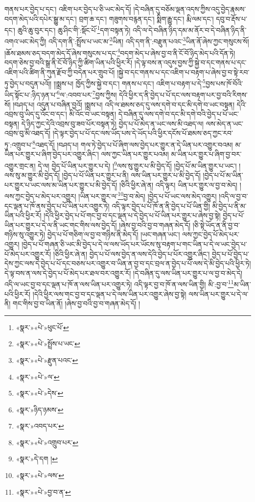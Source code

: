 གནས་པར་བྱེད་པ་དང་། འཇིག་པར་བྱེད་པ་ཅི་ཡང་མེད་དོ། །དེ་བཞིན་དུ་བཅོམ་ལྡན་འདས་ཀྱིས་འདུ་བྱེད་རྣམས་བདག་མེད་པའི་དཔེར་སྒྱུ་མ་དང་། བྲག་ཆ་དང་། གཟུགས་བརྙན་དང་། སྨིག་རྒྱུ་དང་། རྨི་ལམ་དང་། དབུ་བ་རྡོས་པ་དང་། ཆུའི་ཆུ་བུར་དང་། ཆུ་ཤིང་གི་:སྡོང་པོ་\footnote{«སྣར་»«པེ་»ཕུང་པོ་}དག་བསྟན་ཏེ། འདི་ལ་དེ་བཞིན་ཉིད་དམ་མ་ནོར་བ་དེ་བཞིན་ཉིད་ནི་འགའ་ཡང་མེད་ཀྱི། འདི་དག་ནི་:སྤྲོས་པ་ཡང་མ་\footnote{«སྣར་»«པེ་»སྤྲོས་པ་ཡང་}ཡིན། འདི་དག་ནི་:བརྫུན་པའང་\footnote{«སྣར་»«པེ་»རྫུན་པའང་}ཡིན་ནོ་ཞེས་ཀྱང་གསུངས་སོ། །ཆོས་ཐམས་ཅད་བདག་མེད་དོ་ཞེས་གསུངས་པ་དང་\footnote{«སྣར་»«པེ་»ལ་}བདག་མེད་པ་ཞེས་བྱ་བ་ནི་ངོ་བོ་ཉིད་མེད་པའི་དོན་ཏེ། བདག་ཅེས་བྱ་བའི་སྒྲ་ནི་ངོ་བོ་ཉིད་ཀྱི་ཚིག་ཡིན་པའི་ཕྱིར་རོ། །དེ་ལྟ་བས་ན་འདུས་བྱས་ཀྱི་སྐྱེ་བ་དང་གནས་པ་དང་འཇིག་པའི་ཚིག་ནི་ཀུན་རྫོབ་ཀྱི་བདེན་པར་གྲུབ་པོ། །སྐྱེ་བ་དང་གནས་པ་དང་འཇིག་པ་བརྟག་པ་ཞེས་བྱ་བ་སྟེ་རབ་ཏུ་བྱེད་པ་བདུན་པའོ།། །།སྨྲས་པ། ཁྱོད་ཀྱིས་སྐྱེ་བ་དང་། གནས་པ་དང་། འཇིག་པ་བརྟག་པ་དེ་\footnote{«སྣར་»«པེ་»དེས་}བྱས་པས་ཁོ་བོའི་ཡིད་སྟོང་པ་:ཉིད་ཉན་པ་\footnote{«སྣར་»ཉིད་ཉམས་}ལ་:འབབ་པར་\footnote{«སྣར་»འབད་པར་}བྱས་ཀྱིས། དེའི་ཕྱིར་ད་ནི་བྱེད་པ་པོ་དང་ལས་བརྟག་པར་བྱ་བའི་རིགས་སོ། །བཤད་པ། འདུན་པ་བཞིན་བྱའོ། །སྨྲས་པ། འདི་ལ་ཐམས་ཅད་དུ་ལས་དགེ་བ་དང་མི་དགེ་བ་ཡང་བསྟན། དེའི་འབྲས་བུ་ཡིད་དུ་འོང་བ་དང་། མི་འོང་བ་ཡང་བསྟན། དེ་བཞིན་དུ་ལས་དགེ་བ་དང་མི་དགེ་བའི་བྱེད་པ་པོ་ཡང་བསྟན། དེ་ཉིད་ཀྱང་དེའི་འབྲས་བུ་ཟབ་པོར་བསྟན་ཏེ། བྱེད་པ་པོ་མེད་ན་ཡང་ལས་མི་འཐད་ལ། ལས་མེད་ན་ཡང་འབྲས་བུ་མི་འཐད་དོ། །དེ་ལྟར་བྱེད་པ་པོ་དང་ལས་ཡོད་པས་དེ་ཡོད་པའི་ཕྱིར་དངོས་པོ་ཐམས་ཅད་ཀྱང་རབ་ཏུ་:འགྲུབ་པ་\footnote{«སྣར་»«པེ་»འགྲུབ་པར་}འཐད་དོ། །བཤད་པ། གལ་ཏེ་བྱེད་པ་པོ་ཞིག་ལས་བྱེད་པར་གྱུར་ན་དེ་ཡིན་པར་འགྱུར་བའམ། མ་ཡིན་པར་གྱུར་པ་ཞིག་བྱེད་པར་འགྱུར་ཞིང་། ལས་ཀྱང་ཡིན་པར་གྱུར་པའམ། མ་ཡིན་པར་གྱུར་པ་ཞིག་བྱ་བར་འགྱུར་གྲང་ན། དེ་ལ། བྱེད་པོ་ཡིན་པར་གྱུར་པ་དེ། །\footnote{«སྣར་»དེ་དག །}ལས་སུ་གྱུར་པ་མི་བྱེད་དོ། །བྱེད་པོ་མ་ཡིན་གྱུར་པ་ཡང་། །ལས་སུ་མ་གྱུར་མི་བྱེད་དོ། །བྱེད་པ་པོ་ཡིན་པར་གྱུར་པ་ནི། ལས་ཡིན་པར་གྱུར་པ་མི་བྱེད་དོ། །བྱེད་པ་པོ་མ་ཡིན་པར་གྱུར་པ་ཡང་ལས་མ་ཡིན་པར་གྱུར་པ་མི་བྱེད་དོ། །ཅིའི་ཕྱིར་ཞེ་ན། འདི་ལྟར། ཡིན་པར་གྱུར་ལ་བྱ་བ་མེད། །ལས་ཀྱང་བྱེད་པ་མེད་པར་འགྱུར། །ཡིན་པར་གྱུར་ལ་\footnote{«སྣར་»«པེ་»ལས་}བྱ་བ་མེད། །བྱེད་པ་པོ་ཡང་ལས་མེད་འགྱུར། །འདི་ལ་བྱ་བ་དང་ལྡན་པ་ཁོ་ནས་བྱེད་པ་པོ་ཡིན་པར་འགྱུར་ཏེ། འདི་ལྟར་བྱེད་པ་པོ་ཁོ་ན་ནི་བྱེད་པ་པོ་ཡིན་གྱི། མི་བྱེད་པ་ནི་མ་ཡིན་པའི་ཕྱིར་རོ། །དེའི་ཕྱིར་བྱེད་པ་པོ་གང་བྱ་བ་དང་ལྡན་པ་དེ་བྱེད་པ་པོ་ཡིན་པར་གྱུར་པ་ཞེས་བྱ་སྟེ། བྱེད་པ་པོ་ཡིན་པར་གྱུར་པ་དེ་ལ་ནི་ཡང་གང་གིས་ལས་བྱེད་དོ། །ཞེས་བྱ་བའི་བྱ་བ་གཞན་མེད་དོ། །ཅི་སྟེ་ཡོད་ན་ནི་བྱ་བ་གཉིས་སུ་འགྱུར་ཏེ། བྱེད་པ་པོ་གཅིག་ལ་བྱ་བ་གཉིས་ནི་མེད་དོ། །ཡང་གཞན་ཡང་། ལས་ཀྱང་བྱེད་པོ་མེད་པར་འགྱུར། །བྱེད་པ་པོ་གཞན་ཅི་ཡང་མི་བྱེད་པ་དེ་ལ་ལས་ཡོད་པར་ཡོངས་སུ་བརྟག་པ་གང་ཡིན་པ་དེ་ལ་ཡང་བྱེད་པ་པོ་མེད་པར་འགྱུར་རོ། །ཅིའི་ཕྱིར་ཞེ་ན། བྱེད་པ་པོ་ལས་བྱེད་ན་ལས་དེའི་བྱེད་པ་པོར་འགྱུར་ཞིང་། བྱེད་པ་པོ་བྱེད་པ་དེས་ཀྱང་ལས་དེ་བྱེད་པ་པོ་དང་བཅས་པར་འགྱུར་བ་ཡིན་ན་བྱ་བ་དང་བྲལ་ན་བྱེད་པ་པོ་ལས་དེ་མི་བྱེད་པའི་ཕྱིར་ཏེ། དེ་ལྟ་བས་ན་ལས་དེ་བྱེད་པ་པོ་མེད་པར་ཐལ་བར་འགྱུར་རོ། །དེ་བཞིན་དུ་ལས་ཡིན་པར་གྱུར་པ་ལ་བྱ་བ་མེད་དེ། འདི་ལ་ཡང་བྱ་བ་དང་ལྡན་པ་ཁོ་ན་ལས་ཡིན་པར་འགྱུར་ཏེ། འདི་ལྟར་བྱ་བ་ཁོ་ན་ལས་ཡིན་གྱི། མི་:བྱ་བ་\footnote{«སྣར་»«པེ་»བྱ་བ་ན་}མ་ཡིན་པའི་ཕྱིར་རོ། །དེའི་ཕྱིར་ལས་གང་བྱ་བ་དང་ལྡན་པ་དེ་ལས་ཡིན་པར་འགྱུར་ཞེས་བྱ་སྟེ། ལས་ཡིན་པར་གྱུར་པ་དེ་ལ་ནི། གང་གིས་བྱ་བ་ཡིན་ནོ། །ཞེས་བྱ་བའི་བྱ་བ་གཞན་མེད་དོ། །
